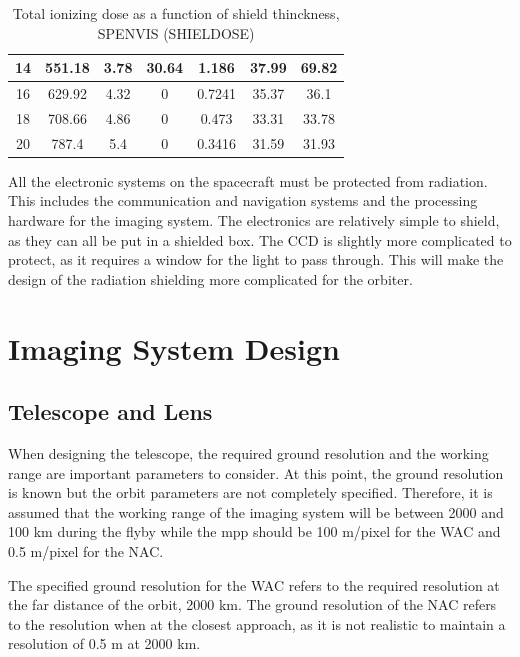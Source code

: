 \begin{table}[htbp]
\begin{tabular}{|c|c|c|r|r|c|r|}
    \hline
    14    & 551.18 & 3.78  & \multicolumn{1}{c|}{30.64} & \multicolumn{1}{c|}{1.186} & 37.99 & \multicolumn{1}{c|}{69.82} \bigstrut\\
    \hline
    16    & 629.92 & 4.32  & \multicolumn{1}{c|}{0} & \multicolumn{1}{c|}{0.7241} & 35.37 & \multicolumn{1}{c|}{36.1} \bigstrut\\
    \hline
    18    & 708.66 & 4.86  & \multicolumn{1}{c|}{0} & \multicolumn{1}{c|}{0.473} & 33.31 & \multicolumn{1}{c|}{33.78} \bigstrut\\
    \hline
    20    & 787.4 & 5.4   & \multicolumn{1}{c|}{0} & \multicolumn{1}{c|}{0.3416} & 31.59 & \multicolumn{1}{c|}{31.93} \bigstrut\\
    \hline
    \end{tabular}%
  \label{tab:tot_dose_ionizing}%
  \caption{Total ionizing dose as a function of shield thinckness, SPENVIS (SHIELDOSE)}
\end{table}%

All the electronic systems on the spacecraft must be protected from radiation. This includes the communication and navigation systems and the processing hardware for the imaging system. The electronics are relatively simple to shield, as they can all be put in a shielded box. The CCD is slightly more complicated to protect, as it requires a window for the light to pass through. This will make the design of the radiation shielding more complicated for the orbiter.
\newpage
\section{Imaging System Design}
\subsection{Telescope and Lens}
When designing the telescope, the required ground resolution and the working range are important parameters to consider. At this point, the ground resolution is known but the orbit parameters are not completely specified. Therefore, it is assumed that the working range of the imaging system will be between 2000 and 100 km during the flyby while the mpp should be 100 m/pixel for the WAC and 0.5 m/pixel for the NAC.

The specified ground resolution for the WAC refers to the required resolution at the far distance of the orbit, 2000 km. The ground resolution of the NAC refers to the resolution when at the closest approach, as it is not realistic to maintain a resolution of 0.5 m at 2000 km. 

